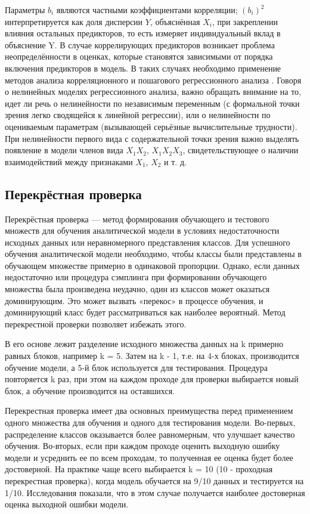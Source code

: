 Параметры $b_i$ являются частными коэффициентами корреляции; $(b_i)^2$ интерпретируется как доля дисперсии $Y$, объяснённая $X_i$, при закреплении влияния остальных предикторов, то есть измеряет индивидуальный вклад  в объяснение Y. В случае коррелирующих предикторов возникает проблема неопределённости в оценках, которые становятся зависимыми от порядка включения предикторов в модель. В таких случаях необходимо применение методов анализа корреляционного и пошагового регрессионного анализа \cite{statseval}.
Говоря о нелинейных моделях регрессионного анализа, важно обращать внимание на то, идет ли речь о нелинейности по независимым переменным (с формальной точки зрения легко сводящейся к линейной регрессии), или о нелинейности по оцениваемым параметрам (вызывающей серьёзные вычислительные трудности). При нелинейности первого вида с содержательной точки зрения важно выделять появление в модели членов вида $X_1 X_2$, $X_1 X_2 X_3$, свидетельствующее о наличии взаимодействий между признаками $X_1$, $X_2$ и т. д.

\subsection{Перекрёстная проверка}
\label{cross-validation}
Перекрёстная проверка --- метод формирования обучающего и тестового множеств для обучения аналитической модели в условиях недостаточности исходных данных или неравномерного представления классов. Для успешного обучения аналитической модели необходимо, чтобы классы были представлены в обучающем множестве примерно в одинаковой пропорции. Однако, если данных недостаточно или процедура сэмплинга при формировании обучающего множества была произведена неудачно, один из классов может оказаться доминирующим. Это может вызвать «перекос» в процессе обучения, и доминирующий класс будет рассматриваться как наиболее вероятный. Метод перекрестной проверки позволяет избежать этого. \cite{cross-validation}

В его основе лежит разделение исходного множества данных на k примерно равных блоков, например k = 5. Затем на k - 1, т.е. на 4-х блоках, производится обучение модели, а 5-й блок используется для тестирования. Процедура повторяется k раз, при этом на каждом проходе для проверки выбирается новый блок, а обучение производится на оставшихся.

Перекрестная проверка имеет два основных преимущества перед применением одного множества для обучения и одного для тестирования модели. Во-первых, распределение классов оказывается более равномерным, что улучшает качество обучения. Во-вторых, если при каждом проходе оценить выходную ошибку модели и усреднить ее по всем проходам, то полученная ее оценка будет более достоверной. На практике чаще всего выбирается k = 10 (10 - проходная перекрестная проверка), когда модель обучается на 9/10 данных и тестируется на 1/10. Исследования показали, что в этом случае получается наиболее достоверная оценка выходной ошибки модели.
